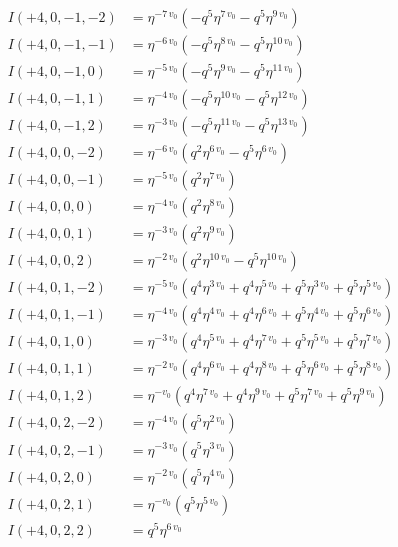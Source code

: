 \documentclass{article}
\begin{document}
\begin{align*}
I(+4, 0, -1, -2) &= \eta^{-7 \, v_{0}} \left( -q^{5} \eta^{7 \, v_{0}} - q^{5} \eta^{9 \, v_{0}} \right) \\
I(+4, 0, -1, -1) &= \eta^{-6 \, v_{0}} \left( -q^{5} \eta^{8 \, v_{0}} - q^{5} \eta^{10 \, v_{0}} \right) \\
I(+4, 0, -1, 0) &= \eta^{-5 \, v_{0}} \left( -q^{5} \eta^{9 \, v_{0}} - q^{5} \eta^{11 \, v_{0}} \right) \\
I(+4, 0, -1, 1) &= \eta^{-4 \, v_{0}} \left( -q^{5} \eta^{10 \, v_{0}} - q^{5} \eta^{12 \, v_{0}} \right) \\
I(+4, 0, -1, 2) &= \eta^{-3 \, v_{0}} \left( -q^{5} \eta^{11 \, v_{0}} - q^{5} \eta^{13 \, v_{0}} \right) \\
I(+4, 0, 0, -2) &= \eta^{-6 \, v_{0}} \left( q^{2} \eta^{6 \, v_{0}} - q^{5} \eta^{6 \, v_{0}} \right) \\
I(+4, 0, 0, -1) &= \eta^{-5 \, v_{0}} \left( q^{2} \eta^{7 \, v_{0}} \right) \\
I(+4, 0, 0, 0) &= \eta^{-4 \, v_{0}} \left( q^{2} \eta^{8 \, v_{0}} \right) \\
I(+4, 0, 0, 1) &= \eta^{-3 \, v_{0}} \left( q^{2} \eta^{9 \, v_{0}} \right) \\
I(+4, 0, 0, 2) &= \eta^{-2 \, v_{0}} \left( q^{2} \eta^{10 \, v_{0}} - q^{5} \eta^{10 \, v_{0}} \right) \\
I(+4, 0, 1, -2) &= \eta^{-5 \, v_{0}} \left( q^{4} \eta^{3 \, v_{0}} + q^{4} \eta^{5 \, v_{0}} + q^{5} \eta^{3 \, v_{0}} + q^{5} \eta^{5 \, v_{0}} \right) \\
I(+4, 0, 1, -1) &= \eta^{-4 \, v_{0}} \left( q^{4} \eta^{4 \, v_{0}} + q^{4} \eta^{6 \, v_{0}} + q^{5} \eta^{4 \, v_{0}} + q^{5} \eta^{6 \, v_{0}} \right) \\
I(+4, 0, 1, 0) &= \eta^{-3 \, v_{0}} \left( q^{4} \eta^{5 \, v_{0}} + q^{4} \eta^{7 \, v_{0}} + q^{5} \eta^{5 \, v_{0}} + q^{5} \eta^{7 \, v_{0}} \right) \\
I(+4, 0, 1, 1) &= \eta^{-2 \, v_{0}} \left( q^{4} \eta^{6 \, v_{0}} + q^{4} \eta^{8 \, v_{0}} + q^{5} \eta^{6 \, v_{0}} + q^{5} \eta^{8 \, v_{0}} \right) \\
I(+4, 0, 1, 2) &= \eta^{-v_{0}} \left( q^{4} \eta^{7 \, v_{0}} + q^{4} \eta^{9 \, v_{0}} + q^{5} \eta^{7 \, v_{0}} + q^{5} \eta^{9 \, v_{0}} \right) \\
I(+4, 0, 2, -2) &= \eta^{-4 \, v_{0}} \left( q^{5} \eta^{2 \, v_{0}} \right) \\
I(+4, 0, 2, -1) &= \eta^{-3 \, v_{0}} \left( q^{5} \eta^{3 \, v_{0}} \right) \\
I(+4, 0, 2, 0) &= \eta^{-2 \, v_{0}} \left( q^{5} \eta^{4 \, v_{0}} \right) \\
I(+4, 0, 2, 1) &= \eta^{-v_{0}} \left( q^{5} \eta^{5 \, v_{0}} \right) \\
I(+4, 0, 2, 2) &= q^{5} \eta^{6 \, v_{0}} \\
\end{align*}
\end{document}
